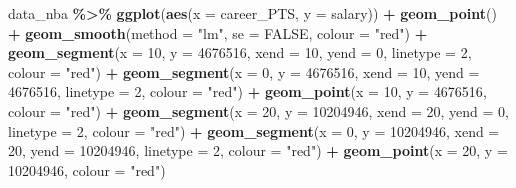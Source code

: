 \documentclass[
]{book}
\newenvironment{Shaded}{\begin{snugshade}}{\end{snugshade}}
\newcommand{\AttributeTok}[1]{\textcolor[rgb]{0.13,0.29,0.53}{#1}}
\newcommand{\ConstantTok}[1]{\textcolor[rgb]{0.56,0.35,0.01}{#1}}
\newcommand{\DecValTok}[1]{\textcolor[rgb]{0.00,0.00,0.81}{#1}}
\newcommand{\FunctionTok}[1]{\textcolor[rgb]{0.13,0.29,0.53}{\textbf{#1}}}
\newcommand{\NormalTok}[1]{#1}
\newcommand{\SpecialCharTok}[1]{\textcolor[rgb]{0.81,0.36,0.00}{\textbf{#1}}}
\newcommand{\StringTok}[1]{\textcolor[rgb]{0.31,0.60,0.02}{#1}}
\begin{document}
\begin{Shaded}
\begin{Highlighting}[]
\NormalTok{data\_nba }\SpecialCharTok{\%\textgreater{}\%} 
  \FunctionTok{ggplot}\NormalTok{(}\FunctionTok{aes}\NormalTok{(}\AttributeTok{x =}\NormalTok{ career\_PTS, }\AttributeTok{y =}\NormalTok{ salary)) }\SpecialCharTok{+}
  \FunctionTok{geom\_point}\NormalTok{() }\SpecialCharTok{+}
  \FunctionTok{geom\_smooth}\NormalTok{(}\AttributeTok{method =} \StringTok{"lm"}\NormalTok{, }\AttributeTok{se =} \ConstantTok{FALSE}\NormalTok{, }\AttributeTok{colour =} \StringTok{"red"}\NormalTok{) }\SpecialCharTok{+}
  \FunctionTok{geom\_segment}\NormalTok{(}\AttributeTok{x =} \DecValTok{10}\NormalTok{, }\AttributeTok{y =} \DecValTok{4676516}\NormalTok{, }\AttributeTok{xend =} \DecValTok{10}\NormalTok{, }\AttributeTok{yend =} \DecValTok{0}\NormalTok{, }\AttributeTok{linetype =} \DecValTok{2}\NormalTok{, }\AttributeTok{colour =} \StringTok{"red"}\NormalTok{) }\SpecialCharTok{+}
  \FunctionTok{geom\_segment}\NormalTok{(}\AttributeTok{x =} \DecValTok{0}\NormalTok{, }\AttributeTok{y =} \DecValTok{4676516}\NormalTok{, }\AttributeTok{xend =} \DecValTok{10}\NormalTok{, }\AttributeTok{yend =} \DecValTok{4676516}\NormalTok{, }\AttributeTok{linetype =} \DecValTok{2}\NormalTok{, }\AttributeTok{colour =} \StringTok{"red"}\NormalTok{) }\SpecialCharTok{+}
  \FunctionTok{geom\_point}\NormalTok{(}\AttributeTok{x =} \DecValTok{10}\NormalTok{, }\AttributeTok{y =} \DecValTok{4676516}\NormalTok{, }\AttributeTok{colour =} \StringTok{"red"}\NormalTok{) }\SpecialCharTok{+}
  \FunctionTok{geom\_segment}\NormalTok{(}\AttributeTok{x =} \DecValTok{20}\NormalTok{, }\AttributeTok{y =} \DecValTok{10204946}\NormalTok{, }\AttributeTok{xend =} \DecValTok{20}\NormalTok{, }\AttributeTok{yend =} \DecValTok{0}\NormalTok{, }\AttributeTok{linetype =} \DecValTok{2}\NormalTok{, }\AttributeTok{colour =} \StringTok{"red"}\NormalTok{) }\SpecialCharTok{+}
  \FunctionTok{geom\_segment}\NormalTok{(}\AttributeTok{x =} \DecValTok{0}\NormalTok{, }\AttributeTok{y =} \DecValTok{10204946}\NormalTok{, }\AttributeTok{xend =} \DecValTok{20}\NormalTok{, }\AttributeTok{yend =} \DecValTok{10204946}\NormalTok{, }\AttributeTok{linetype =} \DecValTok{2}\NormalTok{, }\AttributeTok{colour =} \StringTok{"red"}\NormalTok{) }\SpecialCharTok{+}
  \FunctionTok{geom\_point}\NormalTok{(}\AttributeTok{x =} \DecValTok{20}\NormalTok{, }\AttributeTok{y =} \DecValTok{10204946}\NormalTok{, }\AttributeTok{colour =} \StringTok{"red"}\NormalTok{)}
\end{Highlighting}
\end{Shaded}
\end{document}
